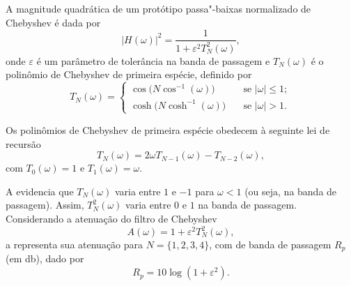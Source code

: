 A magnitude quadrática de um protótipo passa"-baixas normalizado de Chebyshev é dada por
\begin{equation}
	|H(\omega)|^2=\frac{1}{1+\varepsilon^2T_N^2(\omega)},
\end{equation}
onde $\varepsilon$ é um parâmetro de tolerância na banda de passagem e $T_N(\omega)$ é o polinômio de Chebyshev de primeira espécie, definido por
\begin{equation}\label{eq:chebpol}
	T_N(\omega)=\begin{cases}
		\cos\big(N\cos^{-1}(\omega)\big)\quad&\text{se }|\omega|\leq1;\\
		\cosh\big(N\cosh^{-1}(\omega)\big)\quad&\text{se }|\omega|>1.
	\end{cases}
\end{equation}

Os polinômios de Chebyshev de primeira espécie obedecem à seguinte lei de recursão
\begin{equation}
	T_N(\omega)=2\omega T_{N-1}(\omega)-T_{N-2}(\omega),
\end{equation}
com $T_0(\omega)=1$ e $T_1(\omega)=\omega$.

A  evidencia que $T_N(\omega)$ varia entre $1$ e $-1$ para $\omega<1$ (ou seja, na banda de passagem). Assim, $T_N^2(\omega)$ varia entre $0$ e $1$ na banda de passagem. Considerando a atenuação do filtro de Chebyshev
\begin{equation}
	A(\omega)=1+\varepsilon^2T_N^2(\omega),
\end{equation}
a  representa sua atenuação para $N=\{1,2,3,4\}$, com  de banda de passagem $R_p$ (em \unit{\decibel}), dado por
\begin{equation}
	R_p=10\log(1+\varepsilon^2).
\end{equation}

